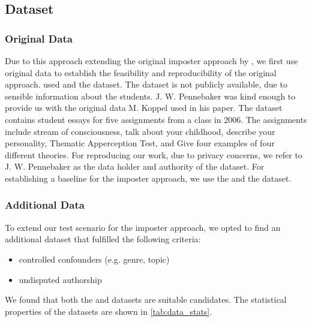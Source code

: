 \subsection{Dataset}
\label{subsec:dataset}

\subsubsection{Original Data}
Due to this approach extending the original imposter approach by \citet{koppel_determining_2014}, 
we first use original data to establish the feasibility and reproducibility of the original approach. 
\citet{koppel_determining_2014} used \dataBlog{} and the \dataStudent{} dataset.
The  \dataStudent{} dataset is not publicly available, due to sensible information about the students.
J. W. Pennebaker was kind enough to provide us with the original data M. Koppel used in his paper.
The dataset contains student essays for five assignments from a class in 2006.
The assignments include stream of consciousness, talk about your childhood, describe your personality, 
Thematic Apperception Test, and Give four examples of four different theories.
For reproducing our work, due to privacy concerns, 
we refer to J. W. Pennebaker as the data holder  and authority of the \dataStudent{} dataset.
For establishing a baseline for the imposter approach, we use the \dataBlog{} and the \dataStudent{} dataset.

\subsubsection{Additional Data}
To extend our test scenario for the imposter approach, we opted to find an additional dataset that fulfilled the following criteria:
\begin{itemize}
    \item controlled confounders (e.g. genre, topic)
    \item undisputed authorship 
    
\end{itemize}

We found that both the \dataPan{} and \dataGutenberg{} datasets are suitable candidates.
The statistical properties of the datasets are shown in \autoref{tab:data_stats}.

